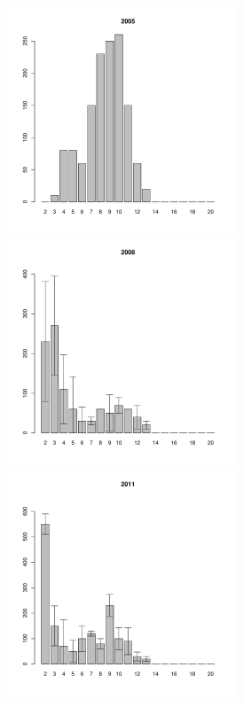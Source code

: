 \begin{figure}[hp]
\begin{minipage}[b]{.3\linewidth}
\begin{center}
	\end{center}
	\end{minipage}
	\begin{minipage}[b]{.3\linewidth}
	\begin{center}
	\includegraphics[width=60mm]{../White_Sea/Luvenga_Goreliy/midlow2_2005_.pdf}
	\end{center}
	\end{minipage}
	\hfill	
	\begin{minipage}[b]{.3\linewidth}
	\begin{center}
	\includegraphics[width=60mm]{../White_Sea/Luvenga_Goreliy/midlow2_2008_.pdf}
	\end{center}
	\end{minipage}
	\hfill
	\begin{minipage}[b]{.3\linewidth}
	\begin{center}
	\includegraphics[width=60mm]{../White_Sea/Luvenga_Goreliy/midlow2_2011_.pdf}

\end{center}
\end{minipage}
\end{figure}
